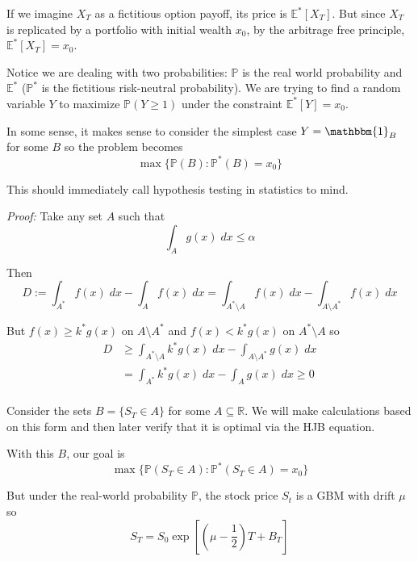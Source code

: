 \documentclass[12pt]{report}
\renewcommand{\P}{\mathbb{P}}
\newcommand{\R}{\mathbb{R}}
\newcommand{\E}{\mathbb{E}}
\newcommand{\ind}{\mathbbm{1}}
\newcommand{\sub}{\subseteq}
\newenvironment*{tbox}[2][gray]{
    \begin{tcolorbox}[
        parbox=false,
        colback=#1!5!white,
        colframe=#1!75!black,
        breakable,
        title={#2}
    ]}
    {\end{tcolorbox}}
\begin{document}
    If we imagine $X_T$ as a fictitious option payoff, its price is $\E^*[X_T]$. But since $X_T$ is replicated by a portfolio with initial wealth $x_0$, by the arbitrage free principle, $\E^*[X_T] = x_0$.

    Notice we are dealing with two probabilities: $\P$ is the real world probability and $\E^*$ ($\P^*$ is the fictitious risk-neutral probability). We are trying to find a random variable $Y$ to maximize $\P(Y \geq 1)$ under the constraint $\E^*[Y] = x_0$.

    In some sense, it makes sense to consider the simplest case $Y = \ind_B$ for some $B$ so the problem becomes 
    \[\max\{\P(B): \P^*(B) = x_0\}\]

    This should immediately call hypothesis testing in statistics to mind.

    \begin{tbox}{\textbf{Neyman-Pearson Lemma:} Let $f, g$ be two nonzero density functions. Let $\alpha \in (0, 1)$. For the maximization problem 
        \[\max\{\int_A f(x)\; dx: \quad \int_A g(x)\; dx \leq \alpha\}\] 
        if there exists a number $k^*$ such  that 
        \[\int_{A^*} g(x)\; dx = \alpha\] 
        on 
        \[A^* = \left\{x: \frac{f(x)}{g(x)} \geq k^*\right\}\]}
        \emph{Proof:} Take any set $A$ such that 
        \[\int_A g(x)\; dx \leq \alpha\]

        Then 
        \[D := \int_{A^*} f(x)\;dx - \int_A f(x)\; dx = \int_{A^*\setminus A} f(x)\; dx - \int_{A \setminus A^*} f(x)\; dx\]

        But $f(x) \geq k^*g(x)$ on $A\setminus A^*$ and $f(x) < k^*g(x)$ on $A^* \setminus A$ so 
        \begin{align*}
            D &\geq \int_{A^* \setminus A} k^* g(x)\; dx - \int_{A \setminus A^*} g(x)\; dx\\
            &= \int_{A^*} k^* g(x)\; dx - \int_A g(x)\; dx \geq 0\\
        \end{align*}
    \end{tbox}

    Consider the sets $B = \{S_T \in A\}$ for some $A \sub \R$. We will make calculations based on this form and then later verify that it is optimal via the HJB equation. 
    
    With this $B$, our goal is 
    \[\max\{\P(S_T \in A): \P^*(S_T \in A) = x_0\}\]

    But under the real-world probability $\P$, the stock price $S_t$ is a GBM with drift $\mu$ so 
    \[S_T = S_0 \exp\left[(\mu - \frac{1}{2})T + B_T\right]\] 
\end{document}
